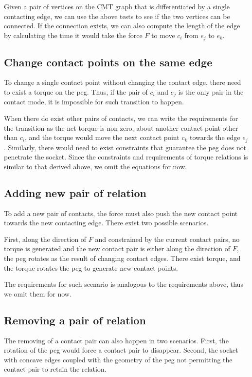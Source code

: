 \documentclass[11p]{article}
\begin{document}
Given a pair of vertices on the CMT graph that is differentiated by a single contacting edge, we can use the above tests to see if the two vertices can be connected. If the connection exists, we can also compute the length of the edge by calculating the time it would take the force $F$ to move $c_i$ from $e_j$ to $e_k$. 


\subsection{Change contact points on the same edge}

To change a single contact point without changing the contact edge, there need to exist a torque on the peg. Thus, if the pair of $c_i$ and $e_j$ is the only pair in the contact mode, it is impossible for such transition to happen. 

When there do exist other pairs of contacts, we can write the requirements for the transition as the net torque is non-zero, about another contact point other than $c_i$, and the torque would move the next contact point $c_k$ towards the edge $e_j$. Similarly, there would need to exist constraints that guarantee the peg does not penetrate the socket. Since the constraints and requirements of torque relations is similar to that derived above, we omit the equations for now. 

\subsection{Adding new pair of relation}

To add a new pair of contacts, the force must also push the new contact point towards the new contacting edge. There exist two possible scenarios. 

First, along the direction of $F$ and constrained by the current contact pairs, no torque is generated and the new contact pair is either along the direction of $F$, the peg rotates as the result of changing contact edges. There exist torque, and the torque rotates the peg to generate new contact points. 

The requirements for such scenario is analogous to the requirements above, thus we omit them for now. 

\subsection{Removing a pair of relation}

The removing of a contact pair can also happen in two scenarios. First, the rotation of the peg would force a contact pair to disappear. Second, the socket with concave edges coupled with the geometry of the peg not permitting the contact pair to retain the relation. 
\end{document}

